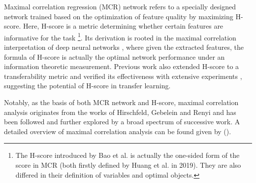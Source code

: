 \documentclass[letterpaper]{article} %
\begin{document}
 Maximal correlation regression (MCR) network \citep{xu2020maximal} refers to a specially designed network trained based on the optimization of feature quality by maximizing H-score. Here, H-score is a metric determining whether certain features are informative for the task  \citep[more formally introduced by][]{bao2019information}\footnote{The H-score introduced by Bao et al. is actually the one-sided form of the score in MCR (both firstly defined by Huang et al. in 2019). They are also differed in their definition of variables and optimal objects.}. Its derivation is rooted in the maximal correlation interpretation of deep neural networks \citep{huang2019universal}, where given the extracted features, the formula of H-score is actually the optimal network performance under an information theoretic measurement. Previous work also extended H-score to a transferability metric and verified its effectiveness with extensive experiments \citep{bao2019information, ibrahim2022newer}, suggesting the potential of H-score in transfer learning.

Notably, as the basis of both MCR network and H-score, maximal correlation analysis originates from the works of Hirschfeld, Gebelein and Renyi \citep{hirschfeld1935connection, gebelein1941statistische, renyi1959measures} and has been followed and further explored by a broad spectrum of successive work. A detailed overview of maximal correlation analysis can be found given by \citeauthor{huang2019universal} (\citeyear{huang2019universal}).


\end{document}
